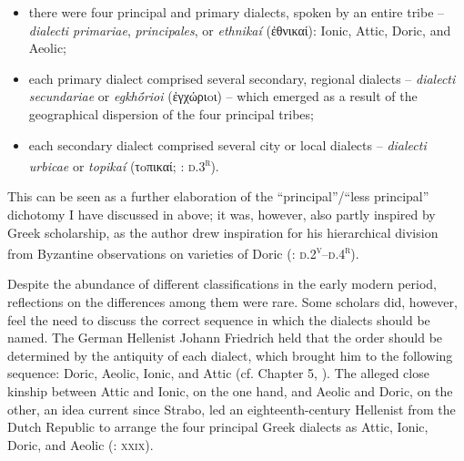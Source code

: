 {\begin{itemize}
\item there were four principal and primary dialects, spoken by an entire tribe – \textit{dialecti primariae}, \textit{principales}, or \textit{ethnikaí} (ἐθνικαί): Ionic, Attic, Doric, and Aeolic;

\item each primary dialect comprised several secondary, regional dialects – \textit{dialecti secundariae} or \textit{egkhṓrioi} (ἐγχώριoι) – which emerged as a result of the geographical dispersion of the four principal tribes;

\item each secondary dialect comprised several city or local dialects – \textit{dialecti urbicae} or \textit{topikaí} (τoπικαί; \citealt{Thryllitsch1709}: \textsc{d.3}\textsc{\textsuperscript{r}}).

\end{itemize}

This can be seen as a further elaboration of the “principal”/“less principal” dichotomy I have discussed in  above; it was, however, also partly inspired by Greek scholarship, as the author drew inspiration for his hierarchical division from Byzantine observations on varieties of Doric (\citealt{Thryllitsch1709}: \textsc{d.2}\textsc{\textsuperscript{v}}\textsc{–d.4}\textsc{\textsuperscript{r}}).

Despite the abundance of different classifications in the early modern period, reflections on the differences among them were rare. Some scholars did, however, feel the need to discuss the correct sequence in which the dialects should be named. The German Hellenist Johann Friedrich \citet[\textsc{iv}]{Facius1782} held that the order should be determined by the antiquity of each dialect, which brought him to the following sequence: Doric, Aeolic, Ionic, and Attic (cf. Chapter 5, ). The alleged close kinship between Attic and Ionic, on the one hand, and Aeolic and Doric, on the other, an idea current since Strabo, led an eighteenth-century Hellenist from the Dutch Republic to arrange the four principal Greek dialects as Attic, Ionic, Doric, and Aeolic (\citealt{Koen1766}: \textsc{xxix}).

}
